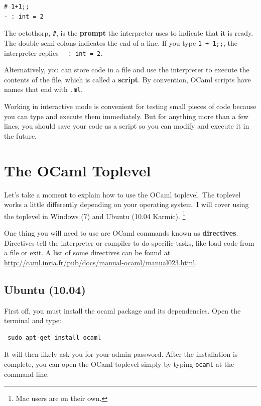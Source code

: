 \documentclass[10pt]{book}
\begin{document}

\beforeverb
\begin{verbatim}
# 1+1;;
- : int = 2
\end{verbatim}
\afterverb
%
The octothorp, {\tt \#}, is the {\bf prompt} the interpreter uses to indicate that it is 
ready. The double semi-colons indicates the end of a line. If you type {\tt 1 + 1;;}, the 
interpreter replies {\tt - : int = 2}.


Alternatively, you can store code in a file and use the interpreter to execute the contents 
of the file, which is called a {\bf script}.  By convention, OCaml scripts have names that 
end with {\tt .ml}.



Working in interactive mode is convenient for testing small pieces of code because you can type 
and execute them immediately.  But for anything more than a few lines, you should save your code 
as a script so you can modify and execute it in the future.

\section{The OCaml Toplevel}

Let's take a moment to explain how to use the OCaml toplevel. The toplevel 
works a little differently depending on your operating system. I will cover 
using the toplevel in Windows (7) and Ubuntu (10.04 Karmic). \footnote{Mac users are on their own.}

One thing you will need to use are OCaml commands known as {\bf directives}. 
Directives tell the interpreter or compiler to do specific tasks, like load 
code from a file or exit. A list of some directives  can be found at 
\url{http://caml.inria.fr/pub/docs/manual-ocaml/manual023.html}. 


\subsection{Ubuntu (10.04)}

First off, you must install the ocaml package and its dependencies. Open the terminal and type:

\beforeverb
\begin{verbatim}
 sudo apt-get install ocaml
\end{verbatim}
\afterverb
It will then likely ask you for your admin password. After the installation is complete, you can 
open the OCaml toplevel simply by typing {\tt ocaml} at the command line.
\end{document}
